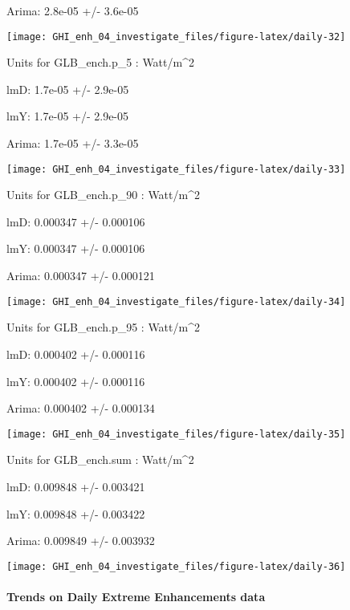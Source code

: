 \documentclass[
  10pt,
  a4paper,oneside]{article}
\begin{document}
Arima: 2.8e-05 +/- 3.6e-05

\begin{center}\texttt{[image: GHI\_enh\_04\_investigate\_files/figure-latex/daily-32]} \end{center}

Units for GLB\_ench.p\_5 : Watt/m\^{}2

lmD: 1.7e-05 +/- 2.9e-05

lmY: 1.7e-05 +/- 2.9e-05

Arima: 1.7e-05 +/- 3.3e-05

\begin{center}\texttt{[image: GHI\_enh\_04\_investigate\_files/figure-latex/daily-33]} \end{center}

Units for GLB\_ench.p\_90 : Watt/m\^{}2

lmD: 0.000347 +/- 0.000106

lmY: 0.000347 +/- 0.000106

Arima: 0.000347 +/- 0.000121

\begin{center}\texttt{[image: GHI\_enh\_04\_investigate\_files/figure-latex/daily-34]} \end{center}

Units for GLB\_ench.p\_95 : Watt/m\^{}2

lmD: 0.000402 +/- 0.000116

lmY: 0.000402 +/- 0.000116

Arima: 0.000402 +/- 0.000134

\begin{center}\texttt{[image: GHI\_enh\_04\_investigate\_files/figure-latex/daily-35]} \end{center}

Units for GLB\_ench.sum : Watt/m\^{}2

lmD: 0.009848 +/- 0.003421

lmY: 0.009848 +/- 0.003422

Arima: 0.009849 +/- 0.003932

\begin{center}\texttt{[image: GHI\_enh\_04\_investigate\_files/figure-latex/daily-36]} \end{center}

\newpage

\hypertarget{trends-on-daily-extreme-enhancements-data}{%
\paragraph{Trends on Daily Extreme Enhancements data}\label{trends-on-daily-extreme-enhancements-data}}
\end{document}
